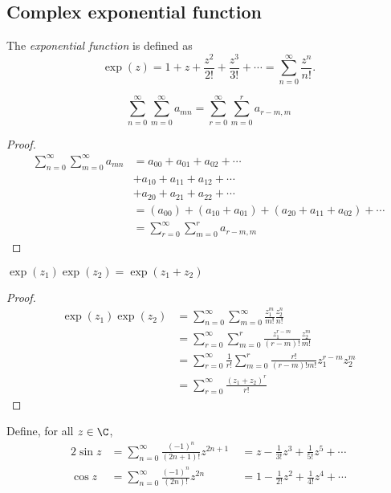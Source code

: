\documentclass[a4paper]{article}
\begin{document}
\subsection{Complex exponential function}
\begin{defi}
  The \emph{exponential function} is defined as
  \[
    \exp (z) = 1 + z + \frac{z^2}{2!} + \frac{z^3}{3!} + \cdots = \sum_{n = 0}^\infty \frac{z^n}{n!}.
  \]
\end{defi}

\begin{lemma}
  \[
    \sum_{n = 0}^\infty\sum_{m = 0}^\infty a_{mn} = \sum_{r = 0}^\infty\sum_{m = 0}^r a_{r - m, m}
  \]
\end{lemma}

\begin{proof}
  \begin{align*}
    \sum_{n = 0}^\infty\sum_{m = 0}^\infty a_{mn} &= a_{00} + a_{01} + a_{02} + \cdots\\
    &+ a_{10} + a_{11} + a_{12} + \cdots\\
    &+ a_{20} + a_{21} + a_{22} + \cdots\\
    &= (a_{00}) + (a_{10} + a_{01}) + (a_{20} + a_{11} + a_{02}) + \cdots\\
    &= \sum_{r = 0}^\infty\sum_{m = 0}^r a_{r - m, m}
  \end{align*}
\end{proof}
\begin{thm}
  $\exp(z_1)\exp(z_2) = \exp(z_1 + z_2)$
\end{thm}

\begin{proof}
  \begin{align*}
    \exp(z_1)\exp(z_2) &= \sum_{n = 0}^\infty\sum_{m = 0}^\infty \frac{z_1^m}{m!}\frac{z_2^n}{n!}\\
    &= \sum_{r = 0}^\infty\sum_{m = 0}^r \frac{z_1^{r - m}}{(r - m)!}\frac{z_2^m}{m!}\\
    &= \sum_{r = 0}^\infty\frac{1}{r!}\sum_{m = 0}^r \frac{r!}{(r - m)!m!}z_1^{r - m}z_2^m\\
    &= \sum_{r = 0}^\infty\frac{(z_1 + z_2)^r}{r!}
  \end{align*}
\end{proof}

\begin{defi}
  Define, for all $z\in \C$,
  \begin{alignat*}{2}
    \sin z &= \sum_{n=0}^\infty \frac{(-1)^n}{(2n+1)!}z^{2n+1} &\;= z - \frac{1}{3!}z^3 + \frac{1}{5!}z^5 + \cdots\\
    \cos z &= \sum_{n=0}^\infty \frac{(-1)^n}{(2n)!}z^{2n} &\;= 1 - \frac{1}{2!}z^2 + \frac{1}{4!}z^4 + \cdots
  \end{alignat*}
\end{defi}
\end{document}
